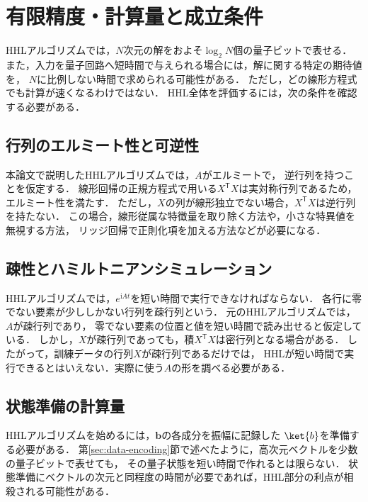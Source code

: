 \section{有限精度・計算量と成立条件}
\label{sec:hhl-assumptions-and-limitations}

HHLアルゴリズムでは，$N$次元の解をおよそ$\log_2N$個の量子ビットで表せる．
また，入力を量子回路へ短時間で与えられる場合には，解に関する特定の期待値を，
$N$に比例しない時間で求められる可能性がある\cite{shimada2020}．
ただし，どの線形方程式でも計算が速くなるわけではない．
HHL全体を評価するには，次の条件を確認する必要がある．

\subsection{行列のエルミート性と可逆性}
\label{subsec:hermiticity-and-invertibility}

本論文で説明したHHLアルゴリズムでは，$A$がエルミートで，
逆行列を持つことを仮定する．
線形回帰の正規方程式で用いる$X^{\mathsf{T}}X$は実対称行列であるため，エルミート性を満たす．
ただし，$X$の列が線形独立でない場合，$X^{\mathsf{T}}X$は逆行列を持たない．
この場合，線形従属な特徴量を取り除く方法や，小さな特異値を無視する方法，
リッジ回帰で正則化項を加える方法などが必要になる．

\subsection{疎性とハミルトニアンシミュレーション}
\label{subsec:sparsity-and-hamiltonian-simulation}

HHLアルゴリズムでは，$e^{\mathrm{i}At}$を短い時間で実行できなければならない．
各行に零でない要素が少ししかない行列を疎行列という．
元のHHLアルゴリズムでは，$A$が疎行列であり，
零でない要素の位置と値を短い時間で読み出せると仮定している\cite{shimada2020}．
しかし，$X$が疎行列であっても，積$X^{\mathsf{T}}X$は密行列となる場合がある．
したがって，訓練データの行列$X$が疎行列であるだけでは，
HHLが短い時間で実行できるとはいえない．実際に使う$A$の形を調べる必要がある．

\subsection{状態準備の計算量}
\label{subsec:state-preparation-cost}

HHLアルゴリズムを始めるには，$\bm{b}$の各成分を振幅に記録した
$\ket{b}$を準備する必要がある．
第\ref{sec:data-encoding}節で述べたように，高次元ベクトルを少数の量子ビットで表せても，
その量子状態を短い時間で作れるとは限らない．
状態準備にベクトルの次元と同程度の時間が必要であれば，HHL部分の利点が相殺される可能性がある．


